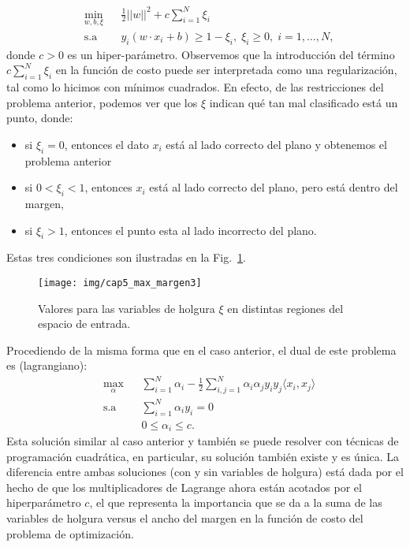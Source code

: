 \begin{equation*}
\begin{aligned}
& \underset{w,b, \xi}{\text{min}}
& & \frac{1}{2}||w||^2 + c\sum\limits_{i=1}^{N} \xi_i \\
& \text{s.a}
& & y_i (w\cdot x_i +b) \geq 1 - \xi_i,\;\xi_i\geq0,\; i = 1, \ldots, N,
\end{aligned}
\end{equation*}
donde $c>0$ es un hiper-parámetro. Observemos que la introducción del término $c\sum_{i=1}^{N} \xi_i$ en la función de costo puede ser interpretada como una regularización, tal como lo hicimos con mínimos cuadrados. En efecto, de las restricciones del problema anterior, podemos ver que los $\xi$ indican qué tan mal clasificado está un punto, donde: 
\begin{itemize}
    \item si $\xi_i = 0$, entonces el dato $x_i$ está al lado correcto del plano y obtenemos el problema anterior
    \item si $0<\xi_i <1$, entonces $x_i$ está al lado correcto del plano, pero está dentro del margen, 
    \item si $\xi_i>1$, entonces el punto esta al lado incorrecto del plano.
\end{itemize}
Estas tres condiciones son ilustradas en la Fig.~\ref{fig:soft_margin}.
\begin{figure}[ht]
    \centering
    \texttt{[image: img/cap5\_max\_margen3]}
    \caption{Valores para las variables de holgura $\xi$ en distintas regiones del espacio de entrada.}
    \label{fig:soft_margin}
\end{figure}

Procediendo de la misma forma que en el caso anterior, el dual de este problema es (lagrangiano):
\begin{equation*}
\begin{aligned}
& \underset{\alpha}{\text{max}}
& & \sum\limits_{i=1}^{N}\alpha_i - \frac{1}{2} \sum\limits_{i,j=1}^{N} \alpha_i \alpha_j y_i y_j \langle x_i, x_j\rangle\\
& \text{s.a}
& & \sum\limits_{i=1}^{N} \alpha_i y_i= 0 \\
& &  &0 \leq \alpha_i \leq c.
\end{aligned}
\end{equation*}
Esta solución similar al caso anterior y también se puede resolver con técnicas de programación cuadrática, en particular, su solución también existe y es única. La diferencia entre ambas soluciones (con y sin variables de holgura) está dada por el hecho de que los multiplicadores de Lagrange ahora están acotados por el hiperparámetro $c$, el que representa la importancia que se da a la suma de las variables de holgura versus el ancho del margen en la función de costo del problema de optimización.

